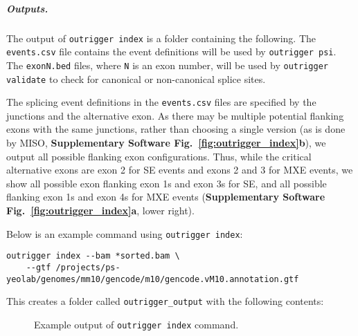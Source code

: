 \subparagraph{Outputs.} The output of \texttt{outrigger index} is a folder containing the following. The \texttt{events.csv} file contains the event definitions will be used by \texttt{outrigger psi}. The \texttt{exonN.bed} files, where \texttt{N} is an exon number, will be used by \texttt{outrigger validate} to check for canonical or non-canonical splice sites.

The splicing event definitions in the \texttt{events.csv} files are specified by the junctions and the alternative exon. As there may be multiple potential flanking exons with the same junctions, rather than choosing a single version (as is done by MISO, \textbf{Supplementary Software Fig.~\ref{fig:outrigger_index}b}), we output all possible flanking exon configurations. Thus, while the critical alternative exons are exon 2 for SE events and exons 2 and 3 for MXE events, we show all possible exon flanking exon 1s and exon 3s for SE, and all possible flanking exon 1s and exon 4s for MXE events (\textbf{Supplementary Software Fig.~\ref{fig:outrigger_index}a}, lower right).

Below is an example command using \texttt{outrigger index}:

\begin{verbatim}
outrigger index --bam *sorted.bam \
    --gtf /projects/ps-yeolab/genomes/mm10/gencode/m10/gencode.vM10.annotation.gtf
\end{verbatim}

This creates a folder called \texttt{outrigger\_output} with the following contents:


\begin{figure}[H]
\caption{Example output of \texttt{outrigger index} command.}
\end{figure}

